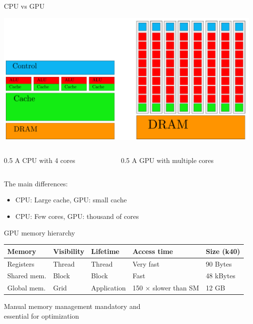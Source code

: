 \documentclass{beamer}
\newenvironment{changemargin}[2]{%
  \begin{list}{}{%
    \setlength{\topsep}{0pt}%
    \setlength{\leftmargin}{#1}%
    \setlength{\rightmargin}{#2}%
    \setlength{\listparindent}{\parindent}%
    \setlength{\itemindent}{\parindent}%
    \setlength{\parsep}{\parskip}%
  }%
  \item[]}{\end{list}}
\begin{document}
\begin{frame}{CPU vs GPU}
\begin{center}
\includegraphics[scale=2]{images/archs.png}
\begin{columns}
\begin{column}{0.5\textwidth}
\hspace{1.6cm} A CPU with 4 cores
\end{column}
\begin{column}{0.5\textwidth}
    A GPU with multiple cores
\end{column}
\end{columns}
\vspace{0.5cm}
The main differences:
\begin{itemize}
\item CPU: Large cache, GPU: small cache
\item CPU: Few cores, GPU: thousand of cores
\end{itemize}
\end{center}
\end{frame}

\begin{frame}{GPU memory hierarchy}
\begin{center}
\begin{table}[h]
\begin{changemargin}{-1cm}{-2cm}
\begin{tabular}{ l | l | l | l | l}
\textbf{Memory} & \textbf{Visibility} & \textbf{Lifetime} & \textbf{Access time} & \textbf{Size (k40)}\\
\hline
Registers & Thread & Thread & Very fast & 90 Bytes \\
Shared mem. & Block & Block & Fast & 48 kBytes \\
Global mem. & Grid & Application & 150 $\times$ slower than SM & 12 GB \\
\end{tabular}
\end{changemargin}
\end{table}
\vspace{2cm}
Manual memory management mandatory and\\ essential for optimization
\end{center}
\end{frame}
\end{document}
